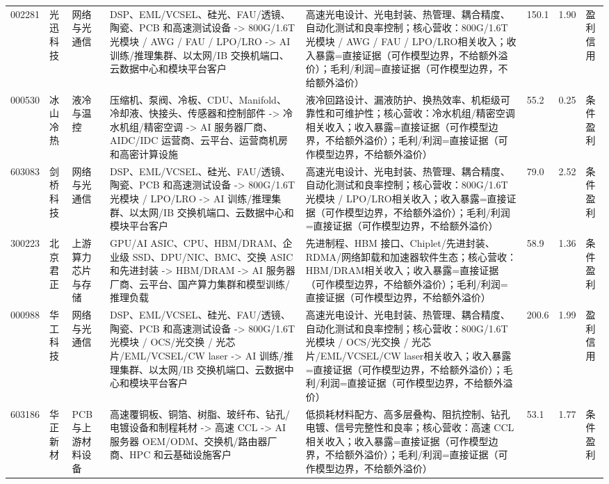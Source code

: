 \begin{longtable}{L{1.1cm}L{1.5cm}L{1.7cm}L{3.4cm}L{3.4cm}R{1.3cm}R{1.0cm}L{1.8cm}}
002281 & 光迅科技 & 网络与光通信 & DSP、EML/VCSEL、硅光、FAU/透镜、陶瓷、PCB 和高速测试设备 -> 800G/1.6T 光模块 / AWG / FAU / LPO/LRO -> AI 训练/推理集群、以太网/IB 交换机端口、云数据中心和模块平台客户 & 高速光电设计、光电封装、热管理、耦合精度、自动化测试和良率控制；核心营收：800G/1.6T 光模块 / AWG / FAU / LPO/LRO相关收入；收入暴露=直接证据（可作模型边界，不给额外溢价）；毛利/利润=直接证据（可作模型边界，不给额外溢价） & 150.1 & 1.90 & 盈利信用\\
000530 & 冰山冷热 & 液冷与温控 & 压缩机、泵阀、冷板、CDU、Manifold、冷却液、快接头、传感器和控制部件 -> 冷水机组/精密空调 -> AI 服务器厂商、AIDC/IDC 运营商、云平台、运营商机房和高密计算设施 & 液冷回路设计、漏液防护、换热效率、机柜级可靠性和可维护性；核心营收：冷水机组/精密空调相关收入；收入暴露=直接证据（可作模型边界，不给额外溢价）；毛利/利润=直接证据（可作模型边界，不给额外溢价） & 55.2 & 0.25 & 条件盈利\\
603083 & 剑桥科技 & 网络与光通信 & DSP、EML/VCSEL、硅光、FAU/透镜、陶瓷、PCB 和高速测试设备 -> 800G/1.6T 光模块 / LPO/LRO -> AI 训练/推理集群、以太网/IB 交换机端口、云数据中心和模块平台客户 & 高速光电设计、光电封装、热管理、耦合精度、自动化测试和良率控制；核心营收：800G/1.6T 光模块 / LPO/LRO相关收入；收入暴露=直接证据（可作模型边界，不给额外溢价）；毛利/利润=直接证据（可作模型边界，不给额外溢价） & 79.0 & 2.52 & 条件盈利\\
300223 & 北京君正 & 上游算力芯片与存储 & GPU/AI ASIC、CPU、HBM/DRAM、企业级 SSD、DPU/NIC、BMC、交换 ASIC 和先进封装 -> HBM/DRAM -> AI 服务器厂商、云平台、国产算力集群和模型训练/推理负载 & 先进制程、HBM 接口、Chiplet/先进封装、RDMA/网络卸载和加速器软件生态；核心营收：HBM/DRAM相关收入；收入暴露=直接证据（可作模型边界，不给额外溢价）；毛利/利润=直接证据（可作模型边界，不给额外溢价） & 58.9 & 1.36 & 条件盈利\\
000988 & 华工科技 & 网络与光通信 & DSP、EML/VCSEL、硅光、FAU/透镜、陶瓷、PCB 和高速测试设备 -> 800G/1.6T 光模块 / OCS/光交换 / 光芯片/EML/VCSEL/CW laser -> AI 训练/推理集群、以太网/IB 交换机端口、云数据中心和模块平台客户 & 高速光电设计、光电封装、热管理、耦合精度、自动化测试和良率控制；核心营收：800G/1.6T 光模块 / OCS/光交换 / 光芯片/EML/VCSEL/CW laser相关收入；收入暴露=直接证据（可作模型边界，不给额外溢价）；毛利/利润=直接证据（可作模型边界，不给额外溢价） & 200.6 & 1.99 & 盈利信用\\
603186 & 华正新材 & PCB 与上游材料设备 & 高速覆铜板、铜箔、树脂、玻纤布、钻孔/电镀设备和制程耗材 -> 高速 CCL -> AI 服务器 OEM/ODM、交换机/路由器厂商、HPC 和云基础设施客户 & 低损耗材料配方、高多层叠构、阻抗控制、钻孔电镀、信号完整性和良率；核心营收：高速 CCL相关收入；收入暴露=直接证据（可作模型边界，不给额外溢价）；毛利/利润=直接证据（可作模型边界，不给额外溢价） & 53.1 & 1.77 & 条件盈利\\

\end{longtable}
